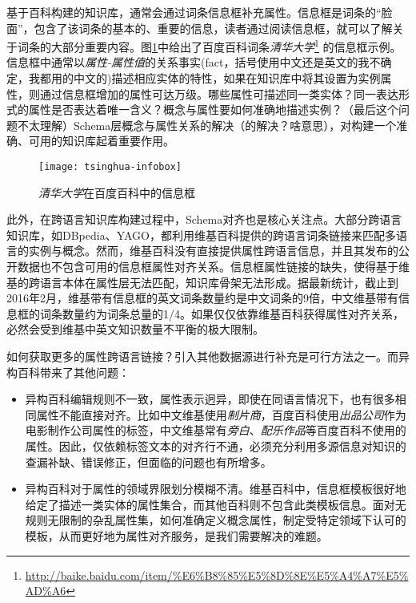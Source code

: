 基于百科构建的知识库，通常会通过词条信息框补充属性。信息框是词条的“脸面”，包含了该词条的基本的、重要的信息，读者通过阅读信息框，就可以了解关于词条的大部分重要内容。图\ref{fig:tsinghua-infobox}中给出了百度百科词条\textit{清华大学}\footnote{\url{http://baike.baidu.com/item/\%E6\%B8\%85\%E5\%8D\%8E\%E5\%A4\%A7\%E5\%AD\%A6}} 的信息框示例。信息框中通常以\textit{属性-属性值}的关系事实(fact，括号使用中文还是英文的我不确定，我都用的中文的)描述相应实体的特性，如果在知识库中将其设置为实例属性，则通过信息框增加的属性可达万级。哪些属性可描述同一类实体？同一表达形式的属性是否表达着唯一含义？概念与属性要如何准确地描述实例？（最后这个问题不太理解）Schema层概念与属性关系的解决（的解决？啥意思），对构建一个准确、可用的知识库起着重要作用。

\begin{figure}[H]
  \centering
  \texttt{[image: tsinghua-infobox]}
  \caption{\textit{清华大学}在百度百科中的信息框}
  \label{fig:tsinghua-infobox}
\end{figure}

此外，在跨语言知识库构建过程中，Schema对齐也是核心关注点。大部分跨语言知识库，如DBpedia、YAGO，都利用维基百科提供的跨语言词条链接来匹配多语言的实例与概念。然而，维基百科没有直接提供属性跨语言信息，并且其发布的公开数据也不包含可用的信息框属性对齐关系。信息框属性链接的缺失，使得基于维基的跨语言本体在属性层无法匹配，知识库骨架无法形成。据最新统计，截止到2016年2月，维基带有信息框的英文词条数量约是中文词条的9倍，中文维基带有信息框的词条数量约为词条总量的1/4。如果仅仅依靠维基百科获得属性对齐关系，必然会受到维基中英文知识数量不平衡的极大限制。

如何获取更多的属性跨语言链接？引入其他数据源进行补充是可行方法之一。而异构百科带来了其他问题：
\begin{itemize}
\item 异构百科编辑规则不一致，属性表示迥异，即使在同语言情况下，也有很多相同属性不能直接对齐。比如中文维基使用\textit{制片商}，百度百科使用\textit{出品公司}作为电影制作公司属性的标签，中文维基常有\textit{旁白}、\textit{配乐作品}等百度百科不使用的属性。因此，仅依赖标签文本的对齐行不通，必须充分利用多源信息对知识的查漏补缺、错误修正，但面临的问题也有所增多。
\item 异构百科对于属性的领域界限划分模糊不清。维基百科中，信息框模板很好地给定了描述一类实体的属性集合，而其他百科则不包含此类模板信息。面对无规则无限制的杂乱属性集，如何准确定义概念属性，制定受特定领域下认可的模板，从而更好地为属性对齐服务，是我们需要解决的难题。
\end{itemize}


